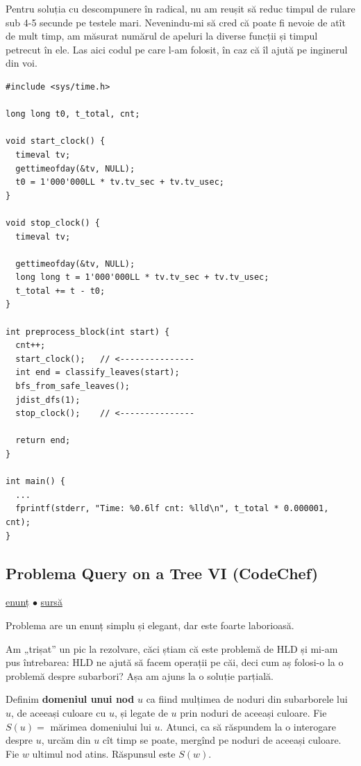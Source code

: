 \documentclass[../main.tex]{subfiles}
\begin{document}
Pentru soluția cu descompunere în radical, nu am reușit să reduc timpul de rulare sub 4-5 secunde pe testele mari. Nevenindu-mi să cred că poate fi nevoie de atît de mult timp, am măsurat numărul de apeluri la diverse funcții și timpul petrecut în ele. Las aici codul pe care l-am folosit, în caz că îl ajută pe inginerul din voi.

\begin{verbatim}
#include <sys/time.h>

long long t0, t_total, cnt;

void start_clock() {
  timeval tv;
  gettimeofday(&tv, NULL);
  t0 = 1'000'000LL * tv.tv_sec + tv.tv_usec;
}

void stop_clock() {
  timeval tv;

  gettimeofday(&tv, NULL);
  long long t = 1'000'000LL * tv.tv_sec + tv.tv_usec;
  t_total += t - t0;
}

int preprocess_block(int start) {
  cnt++;
  start_clock();   // <---------------
  int end = classify_leaves(start);
  bfs_from_safe_leaves();
  jdist_dfs(1);
  stop_clock();    // <---------------

  return end;
}

int main() {
  ...
  fprintf(stderr, "Time: %0.6lf cnt: %lld\n", t_total * 0.000001, cnt);
}
\end{verbatim}

\subsection{Problema Query on a Tree VI (CodeChef)}
\label{problem:qtree6}

\href{https://www.codechef.com/problems/QTREE6}{enunț}
$\bullet$
\hyperref[code:qtree6]{sursă}

Problema are un enunț simplu și elegant, dar este foarte laborioasă.

Am „trișat” un pic la rezolvare, căci știam că este problemă de HLD și mi-am pus întrebarea: HLD ne ajută să facem operații pe căi, deci cum aș folosi-o la o problemă despre subarbori? Așa am ajuns la o soluție parțială.

Definim \textbf{domeniul unui nod} $u$ ca fiind mulțimea de noduri din subarborele lui $u$, de aceeași culoare cu $u$, și legate de $u$ prin noduri de aceeași culoare. Fie $S(u) =$ mărimea domeniului lui $u$. Atunci, ca să răspundem la o interogare despre $u$, urcăm din $u$ cît timp se poate, mergînd pe noduri de aceeași culoare. Fie $w$ ultimul nod atins. Răspunsul este $S(w)$.
\end{document}
